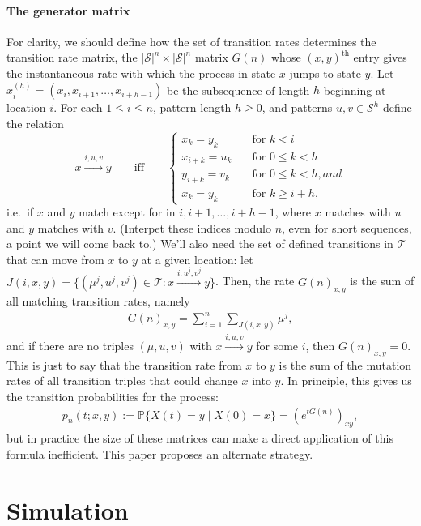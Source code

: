 \documentclass{article}
\renewcommand{\P}{\mathbb{P}}
\newcommand{\calS}{\mathcal{S}}  %
\newcommand{\calT}{\mathcal{T}}  %
\newcommand{\st}{\colon}  %
\theoremstyle{plain}
\theoremstyle{definition}
\begin{document}
\paragraph{The generator matrix}
For clarity, we should define how the set of transition rates determines the transition rate matrix,
the $|\calS|^n \times |\calS|^n$ matrix $G(n)$ whose $(x,y)^\text{th}$ entry gives the instantaneous rate
with which the process in state $x$ jumps to state $y$.
Let $x_i^{(h)} = (x_i, x_{i+1}, \ldots, x_{i+h-1})$ be the subsequence of length $h$ beginning at location $i$.
For each $1\le i \le n$, pattern length $h \ge 0$, and patterns $u,v \in \calS^h$ define the relation
\[
x \xrightarrow{i,u,v} y \qquad \text{iff} \qquad \begin{cases}
  x_k = y_k \quad &\text{for } k<i \\
  x_{i+k} = u_k \quad &\text{for } 0 \le k < h \\
  y_{i+k} = v_k \quad &\text{for } 0 \le k < h, and \\
  x_k = y_k \quad &\text{for } k\ge i+h ,
\end{cases}
\]
i.e.\ if $x$ and $y$ match except for in $i,i+1,\ldots,i+h-1$, where $x$ matches with $u$ and $y$ matches with $v$.
(Interpet these indices modulo $n$, even for short sequences, a point we will come back to.)
We'll also need the set of defined transitions in $\calT$
that can move from $x$ to $y$ at a given location: let  $J(i,x,y) = \{ (\mu^j,u^j,v^j) \in \calT \st x \xrightarrow{i,u^j,v^j} y \}$.
Then, the rate $G(n)_{x,y}$ is the sum of all matching transition rates,
namely
\begin{align} \label{eqn:G_defn}
  G(n)_{x,y} = \sum_{i=1}^n \sum_{J(i,x,y)}  \mu^j ,
\end{align}
and if there are no triples $(\mu,u,v)$ with $x \xrightarrow{i,u,v} y$ for some $i$, then $G(n)_{x,y}=0$.
This is just to say that the transition rate from $x$ to $y$ is the sum of the mutation rates of all transition triples
that could change $x$ into $y$.
In principle, this gives us the transition probabilities for the process:
\begin{align} \label{eqn:full_likelihood}
    p_n(t;x,y) := \P\{ X(t) = y \mid X(0) = x \} = \left(e^{tG(n)}\right)_{xy} ,
\end{align}
but in practice the size of these matrices can make a direct application of this formula inefficient.
This paper proposes an alternate strategy.


\section{Simulation}
\end{document}
